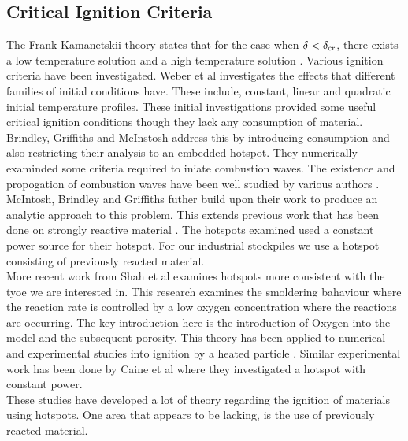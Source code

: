 \subsection{Critical Ignition Criteria}
The Frank-Kamanetskii theory states that for the case when $\delta<\delta_{\text{cr}}$, there exists a low temperature solution and a high temperature solution \cite{Gray93,bowes}. Various ignition criteria have been investigated. Weber et al \cite{weber98} investigates the effects that different families of initial conditions have. These include, constant, linear and quadratic initial temperature profiles. These initial investigations provided some useful critical ignition conditions though they lack any consumption of material. Brindley, Griffiths and McInstosh \cite{brindley01} address this by introducing consumption and also restricting their analysis to an embedded hotspot. They numerically examinded some criteria required to iniate combustion waves. The existence and propogation of combustion waves have been well studied by various authors \cite{merzhanov88,gubernov12,mcintosh04,weber97,mercer96}. 
McIntosh, Brindley and Griffiths \cite{mcintosh02} futher build upon their work to produce an analytic approach to this problem. This extends previous work that has been done on strongly reactive material \cite{Jackson89,kapila81}. The hotspots examined used a constant power source for their hotspot. For our industrial stockpiles we use a hotspot consisting of previously reacted material.\\

More recent work from Shah et al \cite{shah07} examines hotspots more consistent with the tyoe we are interested in. This research examines the smoldering bahaviour where the reaction rate is controlled by a low oxygen concentration where the reactions are occurring. The key introduction here is the introduction of Oxygen into the model and the subsequent porosity. This theory has been applied to numerical and experimental studies into ignition by a heated particle \cite{wang15,glushkov11}. Similar experimental work has been done by Caine et al \cite{caine10} where they investigated a hotspot with constant power.\\

These studies have developed a lot of theory regarding the ignition of materials using hotspots. One area that appears to be lacking, is the use of previously reacted material. 


